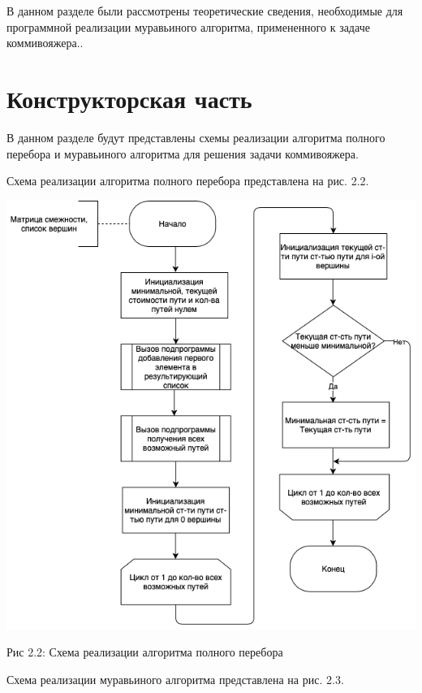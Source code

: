 \documentclass[12pt]{report}
\begin{document}
В данном разделе были рассмотрены теоретические сведения, необходимые для программной реализации муравьиного алгоритма, примененного к задаче коммивояжера..
 
\chapter{Конструкторская часть}

В данном разделе будут представлены схемы реализации алгоритма полного перебора и муравьиного алгоритма для решения задачи коммивояжера.

Схема реализации алгоритма полного перебора представлена на рис. 2.2.

\begin{center}
		\includegraphics[scale=0.6]{schema/Brute.png}
		
			Рис 2.2: Схема реализации алгоритма полного перебора
\end{center}

Схема реализации муравьиного алгоритма представлена на рис. 2.3.
\end{document}
